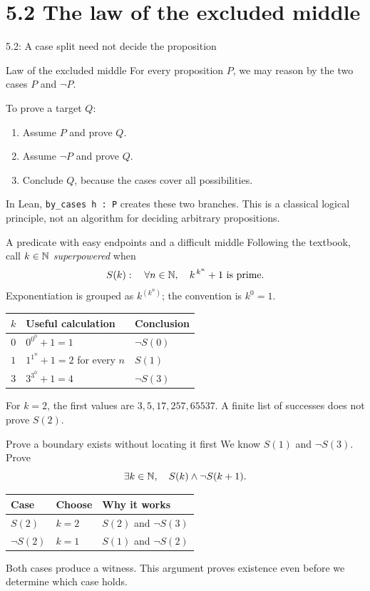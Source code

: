 \section{5.2 The law of the excluded middle}
\begin{frame}{5.2: A case split need not decide the proposition}
\begin{block}{Law of the excluded middle}
For every proposition $P$, we may reason by the two cases $P$ and $\neg P$.
\end{block}
To prove a target $Q$:
\begin{enumerate}
\item Assume $P$ and prove $Q$.
\item Assume $\neg P$ and prove $Q$.
\item Conclude $Q$, because the cases cover all possibilities.
\end{enumerate}
In Lean, \texttt{by\_cases h : P} creates these two branches.
This is a classical logical principle, not an algorithm for deciding arbitrary propositions.
\end{frame}

\begin{frame}{A predicate with easy endpoints and a difficult middle}
Following the textbook, call $k\in\mathbb{N}$ \emph{superpowered} when
\[
S(k):\quad\forall n\in\mathbb{N},\quad k^{\,k^n}+1\text{ is prime}.
\]
Exponentiation is grouped as $k^{(k^n)}$; the convention is $k^0=1$.
\begin{center}
\begin{tabular}{cll}
\toprule
$k$ & Useful calculation & Conclusion\\\midrule
$0$ & $0^{0^0}+1=1$ & $\neg S(0)$\\
$1$ & $1^{1^n}+1=2$ for every $n$ & $S(1)$\\
$3$ & $3^{3^0}+1=4$ & $\neg S(3)$\\\bottomrule
\end{tabular}
\end{center}
For $k=2$, the first values are $3,5,17,257,65537$. A finite list of successes does not prove $S(2)$.
\end{frame}

\begin{frame}{Prove a boundary exists without locating it first}
We know $S(1)$ and $\neg S(3)$. Prove
\[
\exists k\in\mathbb{N},\quad S(k)\land\neg S(k+1).
\]
\begin{center}
\begin{tabular}{lll}
\toprule
Case & Choose & Why it works\\\midrule
$S(2)$ & $k=2$ & $S(2)$ and $\neg S(3)$\\[2mm]
$\neg S(2)$ & $k=1$ & $S(1)$ and $\neg S(2)$\\\bottomrule
\end{tabular}
\end{center}
Both cases produce a witness. This argument proves existence even before we determine which case holds.
\end{frame}

